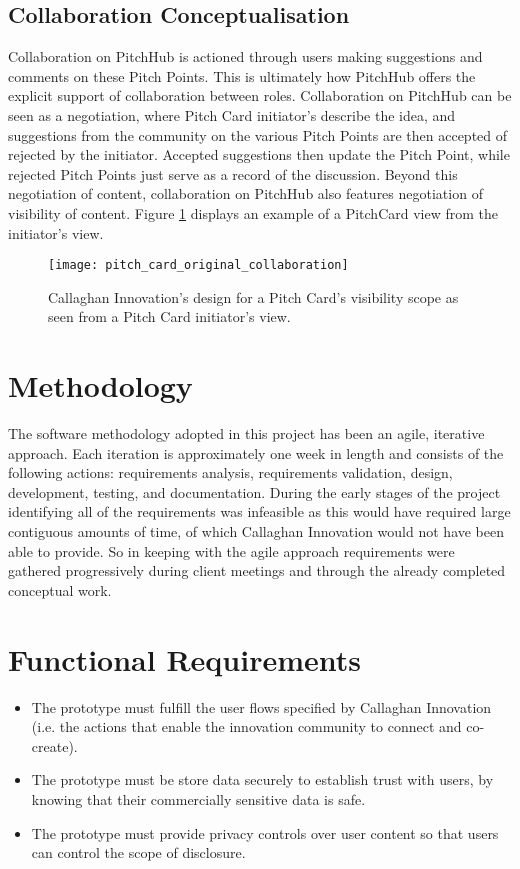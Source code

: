 \subsection{Collaboration Conceptualisation}
Collaboration on PitchHub is actioned through users making suggestions and comments on these Pitch Points. This is ultimately how PitchHub offers the explicit support of collaboration between roles. Collaboration on PitchHub can be seen as a negotiation, where Pitch Card initiator's describe the idea, and suggestions from the community on the various Pitch Points are then accepted of rejected by the initiator. Accepted suggestions then update the Pitch Point, while rejected Pitch Points just serve as a record of the discussion. Beyond this negotiation of content, collaboration on PitchHub also features negotiation of visibility of content. Figure \ref{fig:pitch_card_original_collaboration} displays an example of a PitchCard view from the initiator's view.
\begin{figure}[ht]
    \centering
    \texttt{[image: pitch\_card\_original\_collaboration]}
    \caption{Callaghan Innovation's design for a Pitch Card's visibility scope as seen from a Pitch Card initiator's view.}
    \label{fig:pitch_card_original_collaboration}
\end{figure}

\section{Methodology}
The software methodology adopted in this project has been an agile, iterative approach. Each iteration is approximately one week in length and consists of the following actions: requirements analysis, requirements validation, design, development, testing, and documentation. During the early stages of the project identifying all of the requirements was infeasible as this would have required large contiguous amounts of time, of which Callaghan Innovation would not have been able to provide. So in keeping with the agile approach requirements were gathered progressively during client meetings and through the already completed conceptual work.

\section{Functional Requirements}
\begin{itemize}
\item The prototype must fulfill the user flows specified by Callaghan Innovation (i.e. the actions that enable the innovation community to connect and co-create).
\item The prototype must be store data securely to establish trust with users, by knowing that their commercially sensitive data is safe.
\item The prototype must provide privacy controls over user content so that users can control the scope of disclosure.
\end{itemize}

